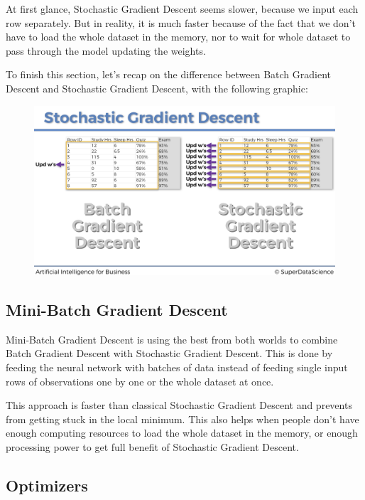 \documentclass[]{book}
\begin{document}
At first glance, Stochastic Gradient Descent seems slower, because we input each row separately. But in reality, it is much faster because of the fact that we don't have to load the whole dataset in the memory, nor to wait for whole dataset to pass through the model updating the weights.

To finish this section, let's recap on the difference between Batch Gradient Descent and Stochastic Gradient Descent, with the following graphic:

\begin{figure}[!htbp]
        \begin{center}
            \includegraphics[scale=0.18]{ANN_31.png}
        \end{center}
\end{figure}

\subsection{Mini-Batch Gradient Descent}

Mini-Batch Gradient Descent is using the best from both worlds to combine Batch Gradient Descent with Stochastic Gradient Descent. This is done by feeding the neural network with batches of data instead of feeding single input rows of observations one by one or the whole dataset at once.

This approach is faster than classical Stochastic Gradient Descent and prevents from getting stuck in the local minimum. This also helps when people don't have enough computing resources to load the whole dataset in the memory, or enough processing power to get full benefit of Stochastic Gradient Descent.

\subsection{Optimizers}
\end{document}
